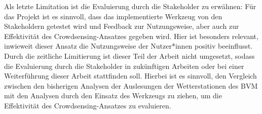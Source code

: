 Als letzte Limitation ist die Evaluierung durch die Stakeholder zu erwähnen: Für das Projekt ist es sinnvoll, dass das implementierte Werkzeug von den Stakeholdern getestet wird und Feedback zur Nutzungsweise, aber auch zur Effektivität des Crowdsensing-Ansatzes gegeben wird. Hier ist besonders relevant, inwieweit dieser Ansatz die Nutzungsweise der Nutzer*innen positiv beeinflusst. Durch die zeitliche Limitierung ist dieser Teil der Arbeit nicht umgesetzt, sodass die Evaluierung durch die Stakeholder in zukünftigen Arbeiten oder bei einer Weiterführung dieser Arbeit stattfinden soll. Hierbei ist es sinnvoll, den Vergleich zwischen den bisherigen Analysen der Auslesungen der Wetterstationen des \ac{BVM} mit den Analysen durch den Einsatz des Werkzeugs zu ziehen, um die Effektivität des Crowdsensing-Ansatzes zu evaluieren.
